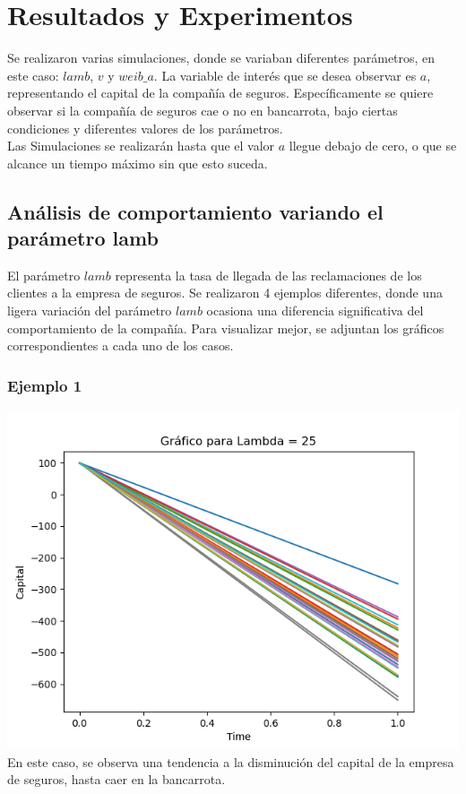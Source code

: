 \documentclass{article}
\begin{document}
 \section{Resultados y Experimentos}
 Se realizaron varias simulaciones, donde se variaban diferentes parámetros, en este caso: $lamb$, $v$ y $weib\_a$. La variable de interés que se desea observar es $a$, representando el capital de la compañía de seguros. Específicamente se quiere observar si la compañía de seguros cae o no en bancarrota, bajo ciertas condiciones y diferentes valores de los parámetros. \\
 Las Simulaciones se realizarán hasta que el valor $a$ llegue debajo de cero, o que se alcance un tiempo máximo sin que esto suceda. 

 \subsection{Análisis de comportamiento variando el parámetro lamb}
 El parámetro $lamb$ representa la tasa de llegada de las reclamaciones de los clientes a la empresa de seguros. Se realizaron 4 ejemplos diferentes, donde una ligera variación del parámetro $lamb$ ocasiona una diferencia significativa del comportamiento de la compañía. 
 Para visualizar mejor, se adjuntan los gráficos correspondientes a cada uno de los casos.

 \subsubsection{Ejemplo 1}
 \includegraphics[scale = 0.8]{lamb1.png}
 En este caso, se observa una tendencia a la disminución del capital de la empresa de seguros, hasta caer en la bancarrota.\\
\end{document}
